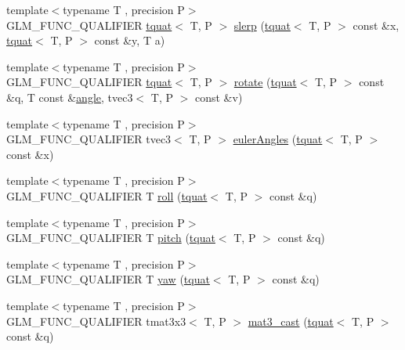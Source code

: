 \begin{DoxyCompactItemize}
\item 
{\footnotesize template$<$typename T , precision P$>$ }\\G\+L\+M\+\_\+\+F\+U\+N\+C\+\_\+\+Q\+U\+A\+L\+I\+F\+I\+E\+R \hyperlink{structglm_1_1tquat}{tquat}$<$ T, P $>$ \hyperlink{group__gtc__quaternion_ga22b438c7252f3fa5b773c9882471652a}{slerp} (\hyperlink{structglm_1_1tquat}{tquat}$<$ T, P $>$ const \&x, \hyperlink{structglm_1_1tquat}{tquat}$<$ T, P $>$ const \&y, T a)
\item 
{\footnotesize template$<$typename T , precision P$>$ }\\G\+L\+M\+\_\+\+F\+U\+N\+C\+\_\+\+Q\+U\+A\+L\+I\+F\+I\+E\+R \hyperlink{structglm_1_1tquat}{tquat}$<$ T, P $>$ \hyperlink{group__gtc__quaternion_gaa8f42979c921e450ff2812fb43c25702}{rotate} (\hyperlink{structglm_1_1tquat}{tquat}$<$ T, P $>$ const \&q, T const \&\hyperlink{group__gtc__quaternion_gad4a4448baedb198b2b1e7880d2544dc9}{angle}, tvec3$<$ T, P $>$ const \&v)
\item 
{\footnotesize template$<$typename T , precision P$>$ }\\G\+L\+M\+\_\+\+F\+U\+N\+C\+\_\+\+Q\+U\+A\+L\+I\+F\+I\+E\+R tvec3$<$ T, P $>$ \hyperlink{group__gtc__quaternion_gadb92ec1c1b0dd6b024176a73fbef3e64}{euler\+Angles} (\hyperlink{structglm_1_1tquat}{tquat}$<$ T, P $>$ const \&x)
\item 
{\footnotesize template$<$typename T , precision P$>$ }\\G\+L\+M\+\_\+\+F\+U\+N\+C\+\_\+\+Q\+U\+A\+L\+I\+F\+I\+E\+R T \hyperlink{group__gtc__quaternion_ga4fd705376c6c1fd667be0055a0ea58ec}{roll} (\hyperlink{structglm_1_1tquat}{tquat}$<$ T, P $>$ const \&q)
\item 
{\footnotesize template$<$typename T , precision P$>$ }\\G\+L\+M\+\_\+\+F\+U\+N\+C\+\_\+\+Q\+U\+A\+L\+I\+F\+I\+E\+R T \hyperlink{group__gtc__quaternion_ga2c08b93a4261c10748fd4d2104346f17}{pitch} (\hyperlink{structglm_1_1tquat}{tquat}$<$ T, P $>$ const \&q)
\item 
{\footnotesize template$<$typename T , precision P$>$ }\\G\+L\+M\+\_\+\+F\+U\+N\+C\+\_\+\+Q\+U\+A\+L\+I\+F\+I\+E\+R T \hyperlink{group__gtc__quaternion_ga724a5df282b70cec0a6cb0d6dcddb6d6}{yaw} (\hyperlink{structglm_1_1tquat}{tquat}$<$ T, P $>$ const \&q)
\item 
{\footnotesize template$<$typename T , precision P$>$ }\\G\+L\+M\+\_\+\+F\+U\+N\+C\+\_\+\+Q\+U\+A\+L\+I\+F\+I\+E\+R tmat3x3$<$ T, P $>$ \hyperlink{group__gtc__quaternion_gae04c39422eb4e450ec8c4f45a1057b40}{mat3\+\_\+cast} (\hyperlink{structglm_1_1tquat}{tquat}$<$ T, P $>$ const \&q)

\end{DoxyCompactItemize}
